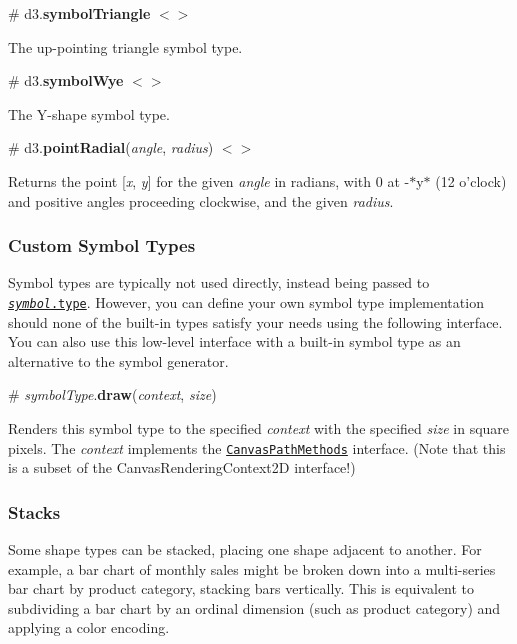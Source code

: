 \label{_symbolTriangle}%
\# d3.{\bfseries symbol\+Triangle} \href{https://github.com/d3/d3-shape/blob/master/src/symbol/triangle.js}{\tt $<$$>$}

The up-\/pointing triangle symbol type.

\label{_symbolWye}%
\# d3.{\bfseries symbol\+Wye} \href{https://github.com/d3/d3-shape/blob/master/src/symbol/wye.js}{\tt $<$$>$}

The Y-\/shape symbol type.

\label{_pointRadial}%
\# d3.{\bfseries point\+Radial}({\itshape angle}, {\itshape radius}) \href{https://github.com/d3/d3-shape/blob/master/src/pointRadial.js}{\tt $<$$>$}

Returns the point \mbox{[}{\itshape x}, {\itshape y}\mbox{]} for the given {\itshape angle} in radians, with 0 at -\/$\ast$y$\ast$ (12 o’clock) and positive angles proceeding clockwise, and the given {\itshape radius}.

\subsubsection*{Custom Symbol Types}

Symbol types are typically not used directly, instead being passed to \href{#symbol_type}{\tt {\itshape symbol}.type}. However, you can define your own symbol type implementation should none of the built-\/in types satisfy your needs using the following interface. You can also use this low-\/level interface with a built-\/in symbol type as an alternative to the symbol generator.

\label{_symbolType_draw}%
\# {\itshape symbol\+Type}.{\bfseries draw}({\itshape context}, {\itshape size})

Renders this symbol type to the specified {\itshape context} with the specified {\itshape size} in square pixels. The {\itshape context} implements the \href{http://www.w3.org/TR/2dcontext/#canvaspathmethods}{\tt Canvas\+Path\+Methods} interface. (Note that this is a subset of the Canvas\+Rendering\+Context2D interface!)

\subsubsection*{Stacks}

\href{http://bl.ocks.org/mbostock/3886208}{\tt }\href{http://bl.ocks.org/mbostock/4060954}{\tt }

Some shape types can be stacked, placing one shape adjacent to another. For example, a bar chart of monthly sales might be broken down into a multi-\/series bar chart by product category, stacking bars vertically. This is equivalent to subdividing a bar chart by an ordinal dimension (such as product category) and applying a color encoding.

